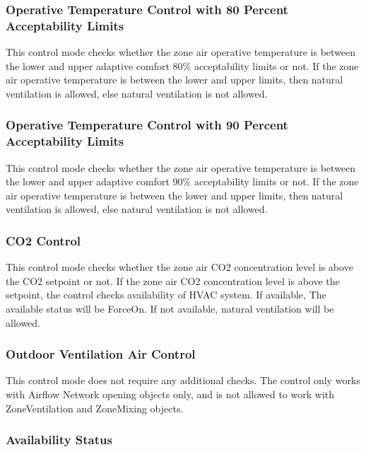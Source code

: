 \subsubsection{Operative Temperature Control with 80 Percent Acceptability Limits}\label{operative-temperature-control-with-80-acceptability-limits}

 This control mode checks whether the zone air operative temperature is between the lower and upper adaptive comfort 80\% acceptability limits or not. If the zone air operative temperature is between the lower and upper limits, then natural ventilation is allowed, else natural ventilation is not allowed. 

\subsubsection{Operative Temperature Control with 90 Percent Acceptability Limits}\label{operative-temperature-control-with-90-acceptability-limits}

 This control mode checks whether the zone air operative temperature is between the lower and upper adaptive comfort 90\% acceptability limits or not. If the zone air operative temperature is between the lower and upper limits, then natural ventilation is allowed, else natural ventilation is not allowed. 

\subsubsection{CO2 Control}\label{co2-control} 

 This control mode checks whether the zone air CO2 concentration level is above the CO2 setpoint or not. If the zone air CO2 concentration level is above the setpoint, the control checks availability of HVAC system. If available, The available status will be ForceOn. If not available, natural ventilation will be allowed. 

\subsubsection{Outdoor Ventilation Air Control}\label{outdoor-ventilation-air-control}

This control mode does not require any additional checks. The control only works with Airflow Network opening objects only, and is not allowed to work with ZoneVentilation and ZoneMixing objects.

\subsubsection{Availability Status}\label{availability-status}

